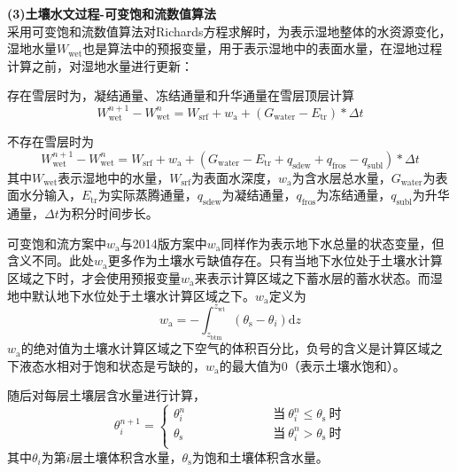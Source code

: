 \textbf {(3)土壤水文过程-可变饱和流数值算法}\\

采用可变饱和流数值算法对Richards方程求解时，为表示湿地整体的水资源变化，湿地水量$W_{\mathrm{wet}}$也是算法中的预报变量，用于表示湿地中的表面水量，在湿地过程计算之前，对湿地水量进行更新：

存在雪层时为，凝结通量、冻结通量和升华通量在雪层顶层计算
\begin{equation}
  W_{\mathrm{wet}}^{n+1}-W_{\mathrm{wet}}^{n}=W_{\mathrm{srf}}+w_{\mathrm{a}}+\left(G_{\mathrm{water}}-E_{\mathrm{tr}}\right)*{\Delta t}
\end{equation}

不存在雪层时为
\begin{equation}
  W_{\mathrm{wet}}^{n+1}-W_{\mathrm{wet}}^{n}=W_{\mathrm{srf}}+w_{\mathrm{a}}+\left(G_{\mathrm{water}}-E_{\mathrm{tr}}+q_{\mathrm{sdew}}+q_{\mathrm{fros}}-q_{\mathrm{subl}}\right)*{\Delta t}
\end{equation}
其中$W_{\mathrm{wet}}$表示湿地中的水量，$W_{\mathrm{srf}}$为表面水深度，$w_{\mathrm{a}}$为含水层总水量，$G_{\mathrm{water}}$为表面水分输入，$E_{\mathrm{tr}}$为实际蒸腾通量，$q_{\mathrm{sdew}}$为凝结通量，$q_{\mathrm{fros}}$为冻结通量，$q_{\mathrm{subl}}$为升华通量，${\Delta t}$为积分时间步长。

可变饱和流方案中$w_{\mathrm {a}} $与2014版方案中$w_{\mathrm {a}} $同样作为表示地下水总量的状态变量，但含义不同。此处$w_{\mathrm {a}} $更多作为土壤水亏缺值存在。只有当地下水位处于土壤水计算区域之下时，才会使用预报变量$w_{\mathrm {a}} $来表示计算区域之下蓄水层的蓄水状态。而湿地中默认地下水位处于土壤水计算区域之下。$w_{\mathrm {a}} $定义为
\begin{equation}
  w_{\mathrm{a}}=-\int_{z_{\mathrm{b t m}}}^{z_{\mathrm{w t}}}\left(\theta_{\mathrm{s}}-\theta_{i}\right){\mathrm d} z
\end{equation}
$w_{\mathrm {a}} $的绝对值为土壤水计算区域之下空气的体积百分比，负号的含义是计算区域之下液态水相对于饱和状态是亏缺的，$w_{\mathrm {a}} $的最大值为0（表示土壤水饱和）。

随后对每层土壤层含水量进行计算，
\begin{equation}
  \theta_{i}^{n+1}=\begin{cases}
    \theta_{i}^{n} &\qquad \quad \qquad \quad \;\text{当}\ \theta_{i}^{n} \leqslant \theta_{\mathrm{s}} \ \text{时} \\
    \theta_{\mathrm{s}}     &\qquad \quad \qquad \quad \;\text{当}\ \theta_{i}^{n} > \theta_{\mathrm{s}} \ \text{时} \\
  \end{cases}
\end{equation}
其中$\theta_{i}$为第$i$层土壤体积含水量，$\theta_{\mathrm{s}}$为饱和土壤体积含水量。

